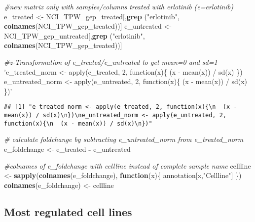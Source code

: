 \documentclass[]{article}
\newenvironment{Shaded}{\begin{snugshade}}{\end{snugshade}}
\newcommand{\CommentTok}[1]{\textcolor[rgb]{0.56,0.35,0.01}{\textit{#1}}}
\newcommand{\ControlFlowTok}[1]{\textcolor[rgb]{0.13,0.29,0.53}{\textbf{#1}}}
\newcommand{\KeywordTok}[1]{\textcolor[rgb]{0.13,0.29,0.53}{\textbf{#1}}}
\newcommand{\NormalTok}[1]{#1}
\newcommand{\OperatorTok}[1]{\textcolor[rgb]{0.81,0.36,0.00}{\textbf{#1}}}
\newcommand{\StringTok}[1]{\textcolor[rgb]{0.31,0.60,0.02}{#1}}
\begin{document}
\begin{Shaded}
\begin{Highlighting}[]
\CommentTok{#new matrix only with samples/columns treated with erlotinib  (e=erlotinib)}
\NormalTok{e_treated <-}\StringTok{ }\NormalTok{NCI_TPW_gep_treated[,}\KeywordTok{grep}\NormalTok{ (}\StringTok{"erlotinib"}\NormalTok{, }\KeywordTok{colnames}\NormalTok{(NCI_TPW_gep_treated))]}
\NormalTok{e_untreated <-}\StringTok{ }\NormalTok{NCI_TPW_gep_untreated[,}\KeywordTok{grep}\NormalTok{ (}\StringTok{"erlotinib"}\NormalTok{, }\KeywordTok{colnames}\NormalTok{(NCI_TPW_gep_treated))]}

\CommentTok{#z-Transformation of e_treated/e_untreated to get mean=0 and sd=1}
\StringTok{'e_treated_norm <- apply(e_treated, 2, function(x)\{}
\StringTok{  (x - mean(x)) / sd(x)}
\StringTok{\})}
\StringTok{e_untreated_norm <- apply(e_untreated, 2, function(x)\{}
\StringTok{  (x - mean(x)) / sd(x)}
\StringTok{\})'}
\end{Highlighting}
\end{Shaded}

\begin{verbatim}
## [1] "e_treated_norm <- apply(e_treated, 2, function(x){\n  (x - mean(x)) / sd(x)\n})\ne_untreated_norm <- apply(e_untreated, 2, function(x){\n  (x - mean(x)) / sd(x)\n})"
\end{verbatim}

\begin{Shaded}
\begin{Highlighting}[]
\CommentTok{# calculate foldchange by subtracting e_untreated_norm from e_treated_norm}
\NormalTok{e_foldchange <-}\StringTok{ }\NormalTok{e_treated }\OperatorTok{-}\StringTok{ }\NormalTok{e_untreated}

\CommentTok{#colnames of e_foldchange with cellline instead of complete sample name}
\NormalTok{cellline <-}\StringTok{ }\KeywordTok{sapply}\NormalTok{(}\KeywordTok{colnames}\NormalTok{(e_foldchange), }\ControlFlowTok{function}\NormalTok{(x)\{}
\NormalTok{  annotation[x,}\StringTok{"Cellline"}\NormalTok{]}
\NormalTok{  \}) }
\KeywordTok{colnames}\NormalTok{(e_foldchange) <-}\StringTok{ }\NormalTok{cellline}
\end{Highlighting}
\end{Shaded}

\hypertarget{most-regulated-cell-lines}{%
\subsection{\texorpdfstring{\textbf{Most regulated cell
lines}}{Most regulated cell lines}}\label{most-regulated-cell-lines}}
\end{document}
